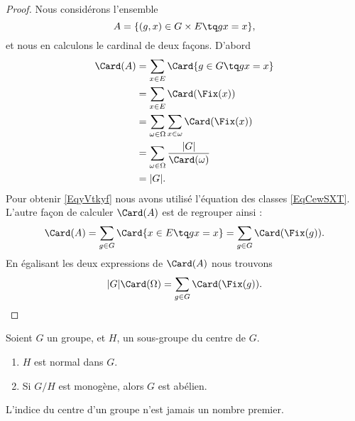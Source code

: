 \begin{proof}
	Nous considérons l'ensemble
	\begin{equation}
		A=\{ (g,x)\in G\times E\tq gx=x \},
	\end{equation}
	et nous en calculons le cardinal de deux façons. D'abord
	\begin{subequations}
		\begin{align}
			\Card(A) & =\sum_{x\in E}\Card\{ g\in G\tq gx=x \}                                      \\
			         & =\sum_{x\in E}\Card(\Fix(x))                                                 \\
			         & =\sum_{\omega\in \Omega}\sum_{x\in \omega}\Card(\Fix(x))                     \\
			         & =\sum_{\omega\in \Omega}\frac{ | G | }{ \Card(\omega) }     \label{EqyVtkyf} \\
			         & =| G |.
		\end{align}
	\end{subequations}
	Pour obtenir \eqref{EqyVtkyf} nous avons utilisé l'équation des classes \eqref{EqCewSXT}. L'autre façon de calculer \( \Card(A)\) est de regrouper ainsi :
	\begin{equation}
		\Card(A)=\sum_{g\in G}\Card\{ x\in E\tq gx=x \}=\sum_{g\in G}\Card(\Fix(g)).
	\end{equation}
	En égalisant les deux expressions de \( \Card(A)\) nous trouvons
	\begin{equation}
		| G |\Card(\Omega)=\sum_{g\in G}\Card(\Fix(g)).
	\end{equation}
\end{proof}

\begin{proposition}     \label{PROPooMYKKooLetZWi}
	Soient \( G\) un groupe, et \( H\), un sous-groupe du centre de \( G\).
	\begin{enumerate}
		\item
		      \( H\) est normal dans \( G\).
		\item
		      Si \( G/H\) est monogène, alors \( G\) est abélien.
	\end{enumerate}
\end{proposition}

\begin{proposition}       \label{PROPooWPQTooECUPLK}
	L'indice du centre d'un groupe n'est jamais un nombre premier.
\end{proposition}


